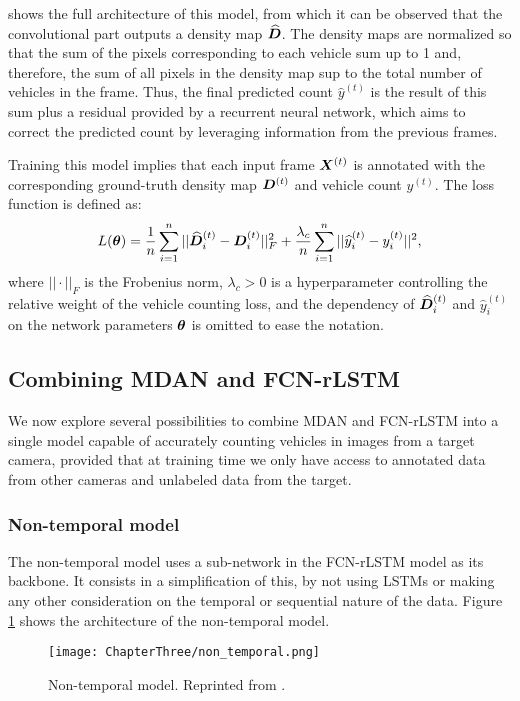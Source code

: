  shows the full architecture of this model, from which it can be observed that the convolutional part outputs a density map $\widehat{{\bm{D}}}$. The density maps are normalized so that the sum of the pixels corresponding to each vehicle sum up to 1 and, therefore, the sum of all pixels in the density map sup to the total number of vehicles in the frame. Thus, the final predicted count $\widehat{y}^{(t)}$ is the result of this sum plus a residual provided by a recurrent neural network, which aims to correct the predicted count by leveraging information from the previous frames.

Training this model implies that each input frame ${\bm{X}}^{(t)}$ is annotated with the corresponding ground-truth density map ${\bm{D}}^{(t)}$ and vehicle count $y^{(t)}$. The loss function is defined as:
\begin{equation}
	L({\bm{\theta}}) = \frac{1}{n} \sum_{i=1}^{n} ||\widehat{{\bm{D}}}^{(t)}_i - {\bm{D}}^{(t)}_i||^2_F + \frac{\lambda_c}{n} \sum_{i=1}^{n} ||\widehat{y}^{(t)}_i - y^{(t)}_i||^2,
\end{equation}
where $||\cdot||_F$ is the Frobenius norm, $\lambda_c > 0$ is a hyperparameter controlling the relative weight of the vehicle counting loss, and the dependency of $\widehat{{\bm{D}}}^{(t)}_i$ and $\hat{y}^{(t)}_i$ on the network parameters ${\bm{\theta}}$ is omitted to ease the notation.

\subsection{Combining MDAN and FCN-rLSTM}
We now explore several possibilities to combine MDAN and FCN-rLSTM into a single model capable of accurately counting vehicles in images from a target camera, provided that at training time we only have access to annotated data from other cameras and unlabeled data from the target.

\subsubsection{Non-temporal model}
The non-temporal model uses a sub-network in the FCN-rLSTM model as its backbone. It consists in a simplification of this, by not using LSTMs or making any other consideration on the temporal or sequential nature of the data. Figure \ref{fig:non_temporal_model} shows the architecture of the non-temporal model.

\begin{figure}[!ht]
	\centering
	\texttt{[image: ChapterThree/non\_temporal.png]}
	\caption{Non-temporal model. Reprinted from \citet{ThesisFrancisco}.}
	\label{fig:non_temporal_model}
\end{figure}

